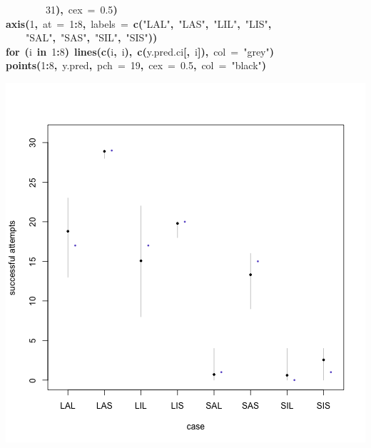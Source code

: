 \documentclass{article}
\makeatletter
\newcommand{\hlnumber}[1]{\textcolor[rgb]{0,0,0}{#1}}%
\newcommand{\hlfunctioncall}[1]{\textcolor[rgb]{.5,0,.33}{\textbf{#1}}}%
\newcommand{\hlstring}[1]{\textcolor[rgb]{.6,.6,1}{#1}}%
\newcommand{\hlkeyword}[1]{\textbf{#1}}%
\newcommand{\hlargument}[1]{\textcolor[rgb]{.69,.25,.02}{#1}}%
\newcommand{\hlsymbol}[1]{#1}%
\newcommand{\hlstd}[1]{\textcolor[rgb]{0,0,0}{#1}}%
\newenvironment{kframe}{%
 \def\FrameCommand##1{\hskip\@totalleftmargin \hskip-\fboxsep
 \colorbox{shadecolor}{##1}\hskip-\fboxsep
     \hskip-\linewidth \hskip-\@totalleftmargin \hskip\columnwidth}%
 \MakeFramed {\advance\hsize-\width
   \@totalleftmargin\z@ \linewidth\hsize
   \@setminipage}}%
 {\par\unskip\endMakeFramed}
\newenvironment{knitrout}{}{} %
\makeatother
\begin{document}
\begin{knitrout}
{\begin{kframe}
\begin{flushleft}
\hlstd{}{\ }{\ }{\ }{\ }{\ }{\ }{\ }{\ }\hlnumber{31}\hlkeyword{)}\hlkeyword{,}{\ }\hlargument{cex}{\ }\hlargument{=}{\ }\hlnumber{0.5}\hlkeyword{)}\hspace*{\fill}\\
\hlstd{}\hlfunctioncall{axis}\hlkeyword{(}\hlnumber{1}\hlkeyword{,}{\ }\hlargument{at}{\ }\hlargument{=}{\ }\hlnumber{1}\hlkeyword{:}\hlnumber{8}\hlkeyword{,}{\ }\hlargument{labels}{\ }\hlargument{=}{\ }\hlfunctioncall{c}\hlkeyword{(}\hlstring{"LAL"}\hlkeyword{,}{\ }\hlstring{"LAS"}\hlkeyword{,}{\ }\hlstring{"LIL"}\hlkeyword{,}{\ }\hlstring{"LIS"}\hlkeyword{,}\hspace*{\fill}\\
\hlstd{}{\ }{\ }{\ }{\ }\hlstring{"SAL"}\hlkeyword{,}{\ }\hlstring{"SAS"}\hlkeyword{,}{\ }\hlstring{"SIL"}\hlkeyword{,}{\ }\hlstring{"SIS"}\hlkeyword{)}\hlkeyword{)}\hspace*{\fill}\\
\hlstd{}\hlkeyword{for}{\ }\hlkeyword{(}\hlsymbol{i}{\ }\hlkeyword{in}{\ }\hlnumber{1}\hlkeyword{:}\hlnumber{8}\hlkeyword{)}{\ }\hlfunctioncall{lines}\hlkeyword{(}\hlfunctioncall{c}\hlkeyword{(}\hlsymbol{i}\hlkeyword{,}{\ }\hlsymbol{i}\hlkeyword{)}\hlkeyword{,}{\ }\hlfunctioncall{c}\hlkeyword{(}\hlsymbol{y.pred.ci}\hlkeyword{[}\hlkeyword{,}{\ }\hlsymbol{i}\hlkeyword{]}\hlkeyword{)}\hlkeyword{,}{\ }\hlargument{col}{\ }\hlargument{=}{\ }\hlstring{"grey"}\hlkeyword{)}\hspace*{\fill}\\
\hlstd{}\hlfunctioncall{points}\hlkeyword{(}\hlnumber{1}\hlkeyword{:}\hlnumber{8}\hlkeyword{,}{\ }\hlsymbol{y.pred}\hlkeyword{,}{\ }\hlargument{pch}{\ }\hlargument{=}{\ }\hlnumber{19}\hlkeyword{,}{\ }\hlargument{cex}{\ }\hlargument{=}{\ }\hlnumber{0.5}\hlkeyword{,}{\ }\hlargument{col}{\ }\hlargument{=}{\ }\hlstring{"black"}\hlkeyword{)}\mbox{}
\normalfont
\end{flushleft}
\includegraphics{pirate-plot-b11} \begin{flushleft}

\end{flushleft}
\end{kframe}}
\end{knitrout}
\end{document}
